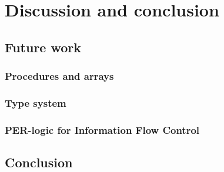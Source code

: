 \section{Discussion and conclusion}\label{sec:conclusion}

\subsection{Future work}\label{sec:future}

\subsubsection{Procedures and arrays}

\subsubsection{Type system}

\subsubsection{PER-logic for Information Flow Control}

\subsection{Conclusion}
